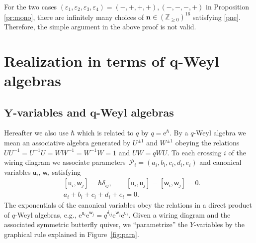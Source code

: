 \documentclass[pdftex]{sigma}
\newcommand{\Z}{{\mathbb Z}}
\newcommand{\e}{{\mathrm e}}
\newcommand{\uu}{{\mathsf u}}
\newcommand{\ww}{{\mathsf w}}
\numberwithin{equation}{section}
\begin{document}
\begin{Remark}
 For the two cases
 $(\varepsilon_1,\varepsilon_2,\varepsilon_3,\varepsilon_4)=(-,+,+,+),
 (-,-,-,+)$ in Proposition \ref{pr:mono}, there are infinitely many
 choices of $\mathbf{n} \in (\Z_{\ge 0})^{16}$ satisfying
 \eqref{pne}. Therefore, the simple argument in the above proof is not
 valid.
\end{Remark}

\section[Realization in terms of q-Weyl algebras]{Realization in terms of $\boldsymbol{q}$-Weyl algebras}\label{s:qw}

\subsection[Y-variables and q-Weyl algebras]{$\boldsymbol{Y}$-variables and $\boldsymbol{q}$-Weyl algebras}

Hereafter we also use $\hbar $ which is related to $q$ by
$q=\e^\hbar$. By a $q$-Weyl algebra we mean an associative algebra
generated by $U^{\pm 1}$ and $W^{\pm 1}$ obeying the relations
$U U^{-1} = U^{-1} U= W W^{-1} = W^{-1}W = 1$ and $UW = q WU$.
%
To each crossing $i$ of the wiring diagram we associate parameters~${\mathscr{P}_i = (a_i, b_i, c_i, d_i, e_i)}$ and canonical variables
$\uu_i$, $\ww_i$ satisfying
\begin{align}
&[\uu_i, \ww_j]= \hbar \delta_{ij}, \qquad [\uu_i, \uu_j]=[\ww_i, \ww_j]=0.
\label{uwh}
\\
&a_i+b_i+c_i+d_i+e_i=0.
\label{ae0}
\end{align}
The exponentials of the canonical variables obey the relations in a
direct product of $q$-Weyl algebras, e.g.,
$\e^{\uu_i} \e^{\ww_j} = q^{\delta_{ij}}\e^{\ww_j}\e^{\uu_i}$. Given a wiring
diagram and the associated symmetric butterfly quiver, we
``parametrize'' the $Y$-variables by the graphical rule explained in
Figure~\ref{fig:para}.
\end{document}
